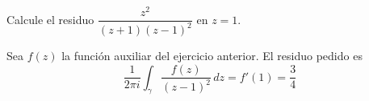 \begin{exercise}
Calcule el residuo $\dfrac {z^2} {(z + 1) (z - 1)^2}$ en $z = 1$.
\end{exercise}

\begin{solution}
Sea $f(z)$ la función auxiliar del ejercicio anterior. El residuo pedido es
$$\frac 1 {2\pi i} \int_\gamma \frac {f(z)} {(z - 1)^2} \, dz = f'(1) = \frac 34$$
\end{solution}
